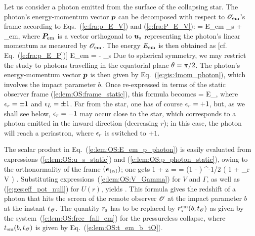 Let us consider a photon emitted from the surface of the collapsing star.
The photon's energy-momentum vector $\bm{p}$ can be decomposed with respect to $\mathscr{O}_{\rm em}$'s
frame according to Eqs.~(\ref{e:fra:p_E_V}) and (\ref{e:fra:P_E_V}):
\be \label{e:lem:OS:p_photon_Oem}
     = E_{\rm em} _{\rm s} + _{\rm em},
\ee
where $\bm{P}_{\rm em}$ is a vector orthogonal to $\bm{u}_{\rm s}$ representing
the photon's linear momentum as measured by $\mathscr{O}_{\rm em}$.
The energy $E_{\rm em}$ is then obtained as [cf. Eq.~(\ref{e:fra:p_E_P})]
\be \label{e:lem:OS:E_em_p_photon}
    E_{\rm em} = - _{\rm s} \cdot {}
\ee
Due to spherical symmetry, we may restrict the study to photons travelling
in the equatorial plane $\theta=\pi/2$.  The photon's energy-momentum vector $\bm{p}$
is then given by Eq.~(\ref{e:gis:4mom_photon}), which involves
the impact parameter $b$. Once re-expressed
in terms of the static observer frame (\ref{e:lem:OS:frame_static}), this
formula becomes
\be \label{e:lem:OS:p_photon_static}
     = E_\infty {} ,
\ee
where $\epsilon_r = \pm 1$ and $\epsilon_L = \pm 1$.
Far from  the star, one has of course $\epsilon_r = +1$, but, as we shall see below,
$\epsilon_r = -1$ may occur close to the star, which corresponds to a photon
emitted in the inward direction (decreasing $r$); in this case, the photon
will reach a periastron, where $\epsilon_r$ is switched to $+1$.

The scalar product in Eq.~(\ref{e:lem:OS:E_em_p_photon}) is easily
evaluated from expressions (\ref{e:lem:OS:u_s_static}) and
(\ref{e:lem:OS:p_photon_static}),
owing to the orthonormality of the frame $(\bm{e}_{(\alpha)})$; one gets
\be \label{e:lem:OS:redshift_gal}
    1 + z = 
    = \Gamma \left(1 -  \right) ^{-1/2}
    \left( 1  + \eps_r V  \right) .
\ee
Substituting expressions~(\ref{e:lem:OS:V_Gamma}) for $V$
and $\Gamma$, as well as (\ref{e:ges:eff_pot_null}) for $U(r)$, yields
\be \label{e:lem:OS:redshift_pless}
     .
\ee
This formula gives the redshift of a photon that hits the screen of the
remote observer $\mathscr{O}$ at the impact parameter $b$ at the instant $t_{\mathscr{O}}$.
The quantity $r_{\rm s}$ has to be replaced by $r_{\rm s}^{\rm em}(b,t_{\mathscr{O}})$
as given by the system~(\ref{e:lem:OS:free_fall_em}) for the pressureless collapse,
where $t_{\rm em}(b,t_{\mathscr{O}})$ is given by Eq.~(\ref{e:lem:OS:t_em_b_tO}).

